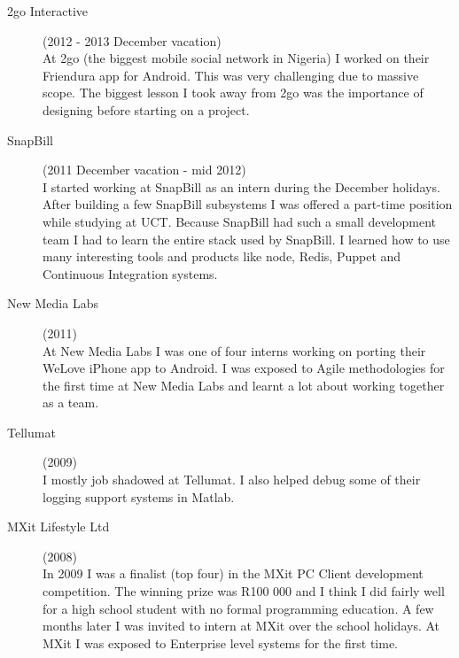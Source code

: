 \documentclass[margin,line,a4paper]{resume}
\begin{document}
\begin{resume}
\begin{description}
                \item[2go Interactive] (2012 - 2013 December vacation) \\
                    At 2go (the biggest mobile social network in Nigeria) I worked on their 
                    Friendura app for Android. This was very challenging due to massive scope. The 
                    biggest lesson I took away from 2go was the importance of designing before 
                    starting on a project. 

                \item[SnapBill] (2011 December vacation - mid 2012) \\
                    I started working at SnapBill as an intern during the December holidays.
                    After building a few SnapBill subsystems I was offered a part-time position while studying at UCT. Because SnapBill had such a small development team I had to learn the entire stack used by SnapBill. I learned how to use many interesting tools and products like node, Redis, Puppet and Continuous Integration systems.

                \item[New Media Labs] (2011) \\
                    At New Media Labs I was one of four interns working on porting their WeLove iPhone app to Android. I was exposed to Agile methodologies for the first time at New Media Labs and learnt a lot about working together as a team.

                \item[Tellumat] (2009) \\
                    I mostly job shadowed at Tellumat. I also helped debug some of their logging 
                    support systems in Matlab.

                \item[MXit Lifestyle Ltd] (2008) \\
                    In 2009 I was a finalist (top four) in the MXit PC Client development 
                    competition. The winning prize was R100 000 and I think I did fairly well for 
                    a high school student with no formal programming education. A few months later 
                    I was invited to intern at MXit over the school holidays. At MXit I was 
                    exposed to Enterprise level systems for the first time.
            \end{description}


\end{resume}
\end{document}
